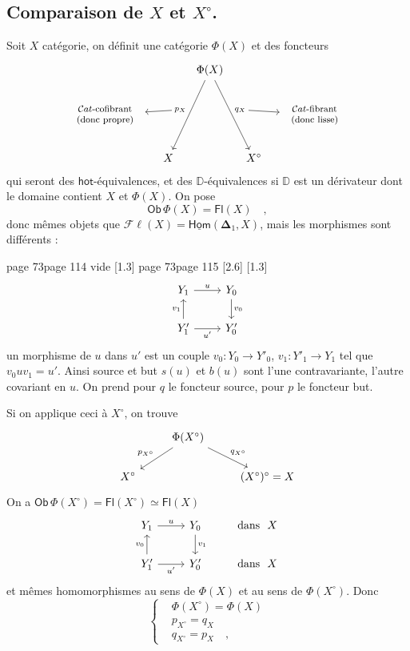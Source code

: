 \documentclass[11pt,leqno]{article}
\newcommand{\msp}[1]{%
  \begingroup\def\thismsp{#1}\def\blankmsp{page 114 vide}%
  \ifx\thismsp\blankmsp
    \marginnote{\scriptsize\sffamily [114: vide]}[1.3\baselineskip]%
  \else\def\followingmsp{page 115}%
    \ifx\thismsp\followingmsp
      \marginnote{\scriptsize\sffamily [page 115]}[2.6\baselineskip]%
    \else\marginnote{\scriptsize\sffamily [#1]}[1.3\baselineskip]\fi
  \fi\endgroup}
\newcommand{\Ob}{\ensuremath{\mathsf{Ob}}}
\newcommand{\Hom}{\ensuremath{\mathsf{Hom}}}
\newcommand{\hot}{\ensuremath{\mathsf{hot}}}
\newcommand{\D}{\ensuremath{\mathbb{D}}}
\newcommand{\Fl}{\ensuremath{\mathsf{Fl}}}
\newcommand{\Cat}{\ensuremath{\mathcal{C}at}}
\begin{document}
\subsection*{Comparaison de $X$ et $X^{\circ}$.}

Soit $X$ catégorie, on définit une catégorie $\Phi(X)$ et des foncteurs
\[
\begin{tikzcd}[column sep=small]
& & \Phi(X) \arrow[ddl, "p_X"{swap, name=P}] \arrow[ddr, "q_X"{name=Q}] & & \\
|[alias=L]| \text{\footnotesize\begin{tabular}{c}$\Cat$-cofibrant\\(donc propre)\end{tabular}} & & & & |[alias=R]| \text{\footnotesize\begin{tabular}{c}$\Cat$-fibrant\\(donc lisse)\\ \end{tabular}} \\
& X & & X^{\circ} &
\arrow[from=P, to=L]
\arrow[from=Q, to=R]
\end{tikzcd}
\]
qui seront des $\hot$-équivalences, et des $\D$-équivalences si $\D$ est un dérivateur dont le domaine contient $X$ et $\Phi(X)$. On pose
\[
\Ob\, \Phi(X) = \Fl(X) \quad ,
\]
donc mêmes objets que $\mathcal{F}\ell(X) = \underline{\Hom}(\boldsymbol{\Delta}_1, X)$, mais les morphismes sont différents :

\msp{page 73}
\[
\begin{tikzcd}
Y_1 \arrow[r, "u"] & Y_0 \arrow[d, "v_0"] \\
Y'_1 \arrow[u, "v_1"] \arrow[r, "u'"{swap}] & Y'_0
\end{tikzcd}
\]
un morphisme de $u$ dans $u'$ est un couple $v_0 : Y_0 \to Y'_0$, $v_1 : Y'_1 \to Y_1$ tel que $v_0uv_1 = u'$. Ainsi source et but $s(u)$ et $b(u)$ sont l'une contravariante, l'autre covariant en $u$. On prend pour $q$ le foncteur source, pour $p$ le foncteur but. %

Si on applique ceci à $X^{\circ}$, on trouve
\[
\begin{tikzcd}
& \Phi(X^{\circ}) \arrow[dl, "p_{X^{\circ}}"{swap}] \arrow[dr, "q_{X^{\circ}}"] & \\
X^{\circ} & & (X^{\circ})^{\circ} = X
\end{tikzcd}
\]
On a $\Ob\, \Phi(X^{\circ}) = \Fl(X^{\circ}) \simeq \Fl(X)$
\[
\begin{tikzcd}
Y_1 \arrow[r, "u"] & Y_0 \arrow[d, "v_1"] & \text{dans}\ \ X \\
Y'_1 \arrow[u, "v_0"] \arrow[r, "u'"{swap}] & Y'_0 & \text{dans}\ \ X
\end{tikzcd}
\]
et mêmes homomorphismes au sens de $\Phi(X)$ et au sens de $\Phi(X^{\circ})$. Donc
\[
\left\{
\begin{aligned}
&\Phi(X^{\circ}) = \Phi(X) \\
&p_{X^{\circ}} = q_X \\
&q_{X^{\circ}} = p_X \quad ,
\end{aligned}
\right.
\]
\end{document}
